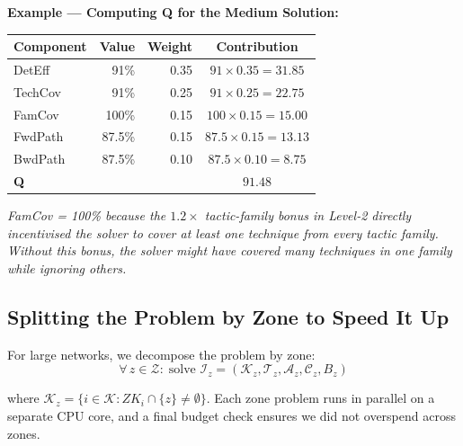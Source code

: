 \documentclass[journal]{IEEEtran}
\newcommand{\calK}{\mathcal{K}}
\newcommand{\calT}{\mathcal{T}}
\newcommand{\calA}{\mathcal{A}}
\newcommand{\calZ}{\mathcal{Z}}
\newcommand{\calC}{\mathcal{C}}
\begin{document}
\begin{examplebox}
\textbf{Example --- Computing Q for the Medium Solution:}
\begin{center}
\small
\renewcommand{\arraystretch}{1.2}
\begin{tabular}{@{}lrrc@{}}
\toprule
\textbf{Component} & \textbf{Value} & \textbf{Weight} &
\textbf{Contribution} \\
\midrule
DetEff   & 91\%   & 0.35 & $91\times0.35=31.85$ \\
TechCov  & 91\%   & 0.25 & $91\times0.25=22.75$ \\
FamCov   & 100\%  & 0.15 & $100\times0.15=15.00$ \\
FwdPath  & 87.5\% & 0.15 & $87.5\times0.15=13.13$ \\
BwdPath  & 87.5\% & 0.10 & $87.5\times0.10=8.75$ \\
\midrule
\textbf{Q} & & & $\mathbf{91.48}$ \\
\bottomrule
\end{tabular}
\end{center}
\textit{FamCov = 100\% because the $1.2\times$ tactic-family
bonus in Level-2 directly incentivised the solver to cover
at least one technique from every tactic family.
Without this bonus, the solver might have covered many
techniques in one family while ignoring others.}
\end{examplebox}

\subsection{Splitting the Problem by Zone to Speed It Up}

For large networks, we decompose the problem by zone:
\begin{equation}
  \forall\, z \in \calZ:\;
  \text{solve } \mathcal{I}_z = (\calK_z, \calT_z, \calA_z,
  \calC_z, B_z)
\end{equation}

where $\calK_z = \{i \in \calK : ZK_i \cap \{z\} \neq
\emptyset\}$.
Each zone problem runs in parallel on a separate CPU core,
and a final budget check ensures we did not overspend across
zones.
\end{document}
